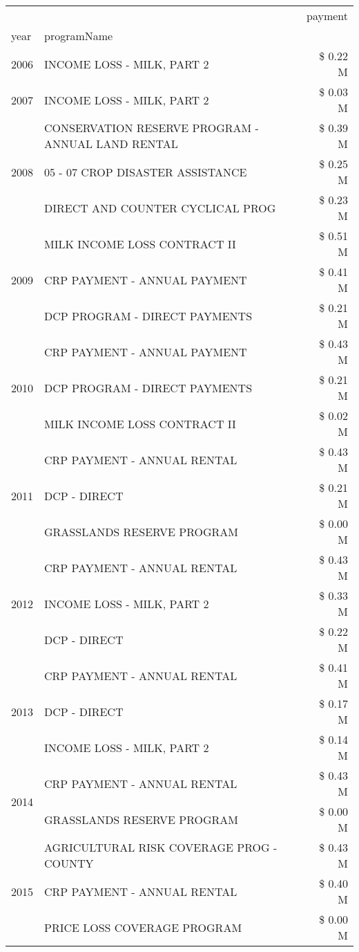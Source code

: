 \begin{tabular}{llr}
\toprule
 &  & payment \\
year & programName &  \\
\midrule
2006 & INCOME LOSS - MILK, PART 2 & \$ 0.22 M \\
\cline{1-3}
2007 & INCOME LOSS - MILK, PART 2 & \$ 0.03 M \\
\cline{1-3}
\multirow[t]{3}{*}{2008} & CONSERVATION RESERVE PROGRAM - ANNUAL LAND RENTAL & \$ 0.39 M \\
 & 05 - 07 CROP DISASTER ASSISTANCE & \$ 0.25 M \\
 & DIRECT AND COUNTER CYCLICAL PROG & \$ 0.23 M \\
\cline{1-3}
\multirow[t]{3}{*}{2009} & MILK INCOME LOSS CONTRACT II & \$ 0.51 M \\
 & CRP PAYMENT - ANNUAL PAYMENT & \$ 0.41 M \\
 & DCP PROGRAM - DIRECT PAYMENTS & \$ 0.21 M \\
\cline{1-3}
\multirow[t]{3}{*}{2010} & CRP PAYMENT - ANNUAL PAYMENT & \$ 0.43 M \\
 & DCP PROGRAM - DIRECT PAYMENTS & \$ 0.21 M \\
 & MILK INCOME LOSS CONTRACT II & \$ 0.02 M \\
\cline{1-3}
\multirow[t]{3}{*}{2011} & CRP PAYMENT - ANNUAL RENTAL & \$ 0.43 M \\
 & DCP - DIRECT & \$ 0.21 M \\
 & GRASSLANDS RESERVE PROGRAM & \$ 0.00 M \\
\cline{1-3}
\multirow[t]{3}{*}{2012} & CRP PAYMENT - ANNUAL RENTAL & \$ 0.43 M \\
 & INCOME LOSS - MILK, PART 2 & \$ 0.33 M \\
 & DCP - DIRECT & \$ 0.22 M \\
\cline{1-3}
\multirow[t]{3}{*}{2013} & CRP PAYMENT - ANNUAL RENTAL & \$ 0.41 M \\
 & DCP - DIRECT & \$ 0.17 M \\
 & INCOME LOSS - MILK, PART 2 & \$ 0.14 M \\
\cline{1-3}
\multirow[t]{2}{*}{2014} & CRP PAYMENT - ANNUAL RENTAL & \$ 0.43 M \\
 & GRASSLANDS RESERVE PROGRAM & \$ 0.00 M \\
\cline{1-3}
\multirow[t]{3}{*}{2015} & AGRICULTURAL RISK COVERAGE PROG - COUNTY & \$ 0.43 M \\
 & CRP PAYMENT - ANNUAL RENTAL & \$ 0.40 M \\
 & PRICE LOSS COVERAGE PROGRAM & \$ 0.00 M \\

\end{tabular}
